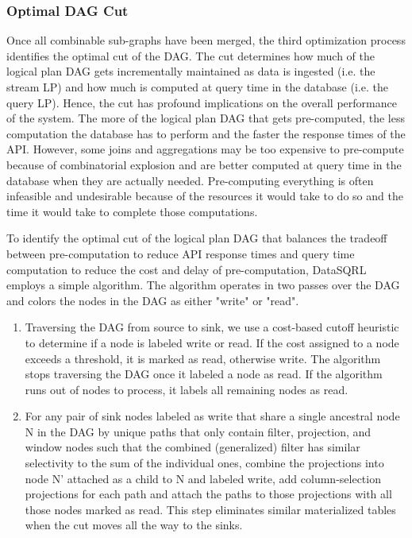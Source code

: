 \documentclass[	DIV=calc,%
							paper=letter,%
							fontsize=11pt,%
							twocolumn]{scrartcl}	 					%
\begin{document}
\subsubsection{Optimal DAG Cut}
\label{sec:dag_cut_opt}

Once all combinable sub-graphs have been merged, the third optimization process identifies the optimal cut of the DAG. The cut determines how much of the logical plan DAG gets incrementally maintained as data is ingested (i.e. the stream LP) and how much is computed at query time in the database (i.e. the query LP). Hence, the cut has profound implications on the overall performance of the system. The more of the logical plan DAG that gets pre-computed, the less computation the database has to perform and the faster the response times of the API. However, some joins and aggregations may be too expensive to pre-compute because of combinatorial explosion and are better computed at query time in the database when they are actually needed. Pre-computing everything is often infeasible and undesirable because of the resources it would take to do so and the time it would take to complete those computations.

To identify the optimal cut of the logical plan DAG that balances the tradeoff between pre-computation to reduce API response times and query time computation to reduce the cost and delay of pre-computation, DataSQRL employs a simple algorithm.
The algorithm operates in two passes over the DAG and colors the nodes in the DAG as either "write" or "read".
\begin{enumerate}
    \item Traversing the DAG from source to sink, we use a cost-based cutoff heuristic to determine if a node is labeled write or read. If the cost assigned to a node exceeds a threshold, it is marked as read, otherwise write. The algorithm stops traversing the DAG once it labeled a node as read. If the algorithm runs out of nodes to process, it labels all remaining nodes as read.
    \item For any pair of sink nodes labeled as write that share a single ancestral node N in the DAG by unique paths that only contain filter, projection, and window nodes such that the combined (generalized) filter has similar selectivity to the sum of the individual ones, combine the projections into node N' attached as a child to N and labeled write, add column-selection projections for each path and attach the paths to those projections with all those nodes marked as read. This step eliminates similar materialized tables when the cut moves all the way to the sinks.
\end{enumerate}
\end{document}
